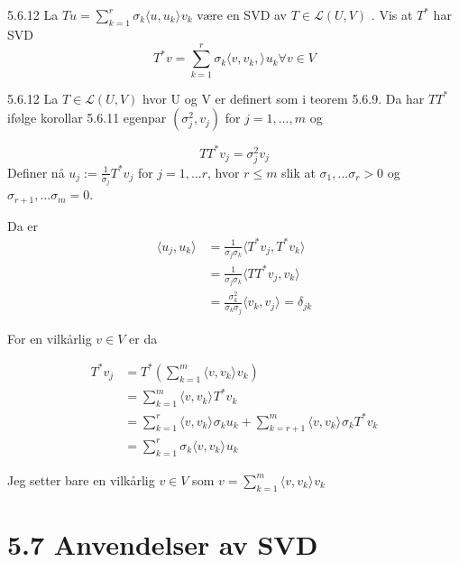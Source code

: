 \documentclass[a4paper,norsk]{article}
\renewcommand{\leq}{\leqslant}
\begin{document}
\begin{oppgavebox}{5.6.12}{}
La $ Tu = \sum_{ k=1 }^{ r } \sigma _{ k} \langle u, u_k \rangle_{  } v_k  $ være en SVD av $ T \in \mathcal{L }(U, V) $ . Vis at $ T^* $ har SVD 
\[
    T^* v = \sum_{ k=1 }^{ r } \sigma _{ k} \langle v, v_k,  \rangle_{  } u_k \forall v \in V
\]


\begin{proofbox}{5.6.12}{}
La $ T \in \mathcal{L}(U, V) $ hvor U og V er definert som i teorem 5.6.9. Da har $ TT^* $ ifølge korollar 5.6.11 egenpar $ \left( \sigma _{ j}^2, v_j  \right)  $  for $ j = 1, ..., m $ og

\[
    TT^*v_j = \sigma _{ j} ^2 v_j
\]
Definer nå $ u_j := \frac{ 1 }{ \sigma _{ j}} T^*v_j $  for $ j= 1, ... r $, hvor $ r \leq m $ slik at $ \sigma _{ 1} , ... \sigma _{ r} > 0 $ og $ \sigma _{ r+1} , ... \sigma _{ m} =0 $.

Da er 
\begin{align*}
    \langle u_j, u_k \rangle_{  } &= \frac{ 1 }{ \sigma _{ j} \sigma _{ k}  } \langle T^*v_j, T^*v_k \rangle_{  } \\
    &= \frac{ 1 }{ \sigma _{ j} \sigma _{ k} } \langle TT^* v_j, v_k \rangle_{  } \\
    &= \frac{ \sigma _{ k} ^2  }{ \sigma _{ k} \sigma _{ j}  } \langle v_k, v_j \rangle_{  } = \delta_{jk}
\end{align*}

For en vilkårlig $ v \in V $ er da

\begin{align*}
    T^* v_j &= T^*  \left(  \sum_{ k=1 }^{ m } \langle v, v_k \rangle_{  } v_k  \right) \\
    &= \sum_{ k=1 }^{ m } \langle v, v_k \rangle_{  } T^*v_k \\
    &= \sum_{ k=1 }^{ r } \langle v, v_k \rangle_{  } \sigma _{ k} u_k + \sum_{ k=r+1 }^{ m } \langle v, v_k \rangle_{  } \sigma _{ k} T^*v_k  \\
    &= \sum_{ k=1 }^{ r } \sigma _{ k} \langle v, v_k \rangle_{  } u_k
\end{align*}

Jeg setter bare en vilkårlig $ v \in V $ som $ v = \sum_{ k=1 }^{ m } \langle v, v_k \rangle_{  } v_k $ 
\end{proofbox}
\end{oppgavebox}

\section*{5.7 Anvendelser av SVD}
\end{document}
